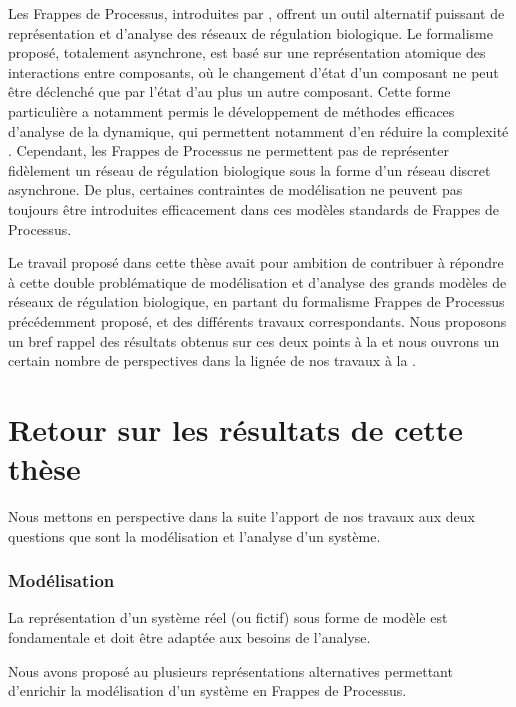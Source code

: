 Les Frappes de Processus, introduites par ,
offrent un outil alternatif puissant de représentation et d'analyse des
réseaux de régulation biologique.
Le formalisme proposé, totalement asynchrone, est basé sur une représentation
atomique des interactions entre composants,
où le changement d'état d'un composant ne peut être déclenché que par l'état d'au plus
un autre composant.
Cette forme particulière a notamment permis le développement de méthodes efficaces
d'analyse de la dynamique, qui permettent notamment d'en réduire la complexité \cite{PMR12-MSCS}.
Cependant, les Frappes de Processus ne permettent pas de représenter fidèlement
un réseau de régulation biologique sous la forme d'un réseau discret asynchrone.
De plus, certaines contraintes de modélisation ne peuvent pas toujours être introduites
efficacement dans ces modèles standards de Frappes de Processus.

Le travail proposé dans cette thèse avait pour ambition de contribuer à répondre
à cette double problématique
de modélisation et d'analyse des grands modèles de réseaux de régulation biologique,
en partant du formalisme Frappes de Processus précédemment proposé,
et des différents travaux correspondants.
Nous proposons un bref rappel des résultats obtenus sur ces deux points à la 
et nous ouvrons un certain nombre de perspectives dans la lignée de nos travaux
à la .



\section{Retour sur les résultats de cette thèse}

Nous mettons en perspective dans la suite l'apport de nos travaux aux deux questions
que sont la modélisation et l'analyse d'un système.

\subsubsection*{Modélisation}

La représentation d'un système réel (ou fictif) sous forme de modèle est fondamentale
et doit être adaptée aux besoins de l'analyse.

\myskip

Nous avons proposé au  plusieurs représentations alternatives
permettant d'enrichir la modélisation d'un système en Frappes de Processus.

